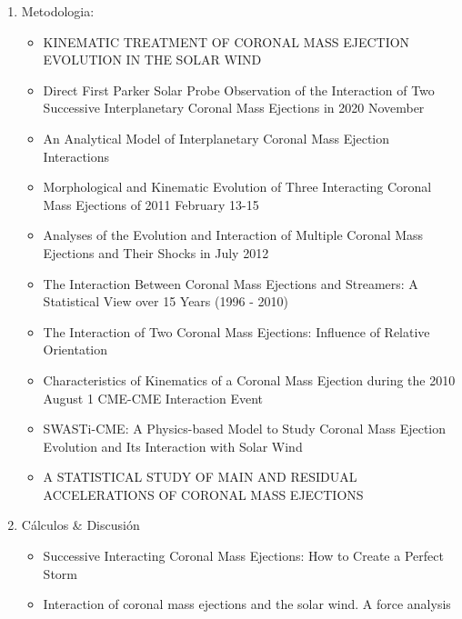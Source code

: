 \begin{enumerate}

    \item Metodologia:
    \begin{itemize}
    \item
    KINEMATIC TREATMENT OF CORONAL MASS EJECTION EVOLUTION IN THE SOLAR WIND
    \item
    Direct First Parker Solar Probe Observation of the Interaction of Two Successive Interplanetary Coronal Mass Ejections in 2020 November
    \item
    An Analytical Model of Interplanetary Coronal Mass Ejection Interactions
    \item
    Morphological and Kinematic Evolution of Three Interacting Coronal Mass Ejections of 2011 February 13-15
    \item
    Analyses of the Evolution and Interaction of Multiple Coronal Mass Ejections and Their Shocks in July 2012
    \item
    The Interaction Between Coronal Mass Ejections and Streamers: A Statistical View over 15 Years (1996 - 2010)
    \item
    The Interaction of Two Coronal Mass Ejections: Influence of Relative Orientation
    \item
    Characteristics of Kinematics of a Coronal Mass Ejection during the 2010 August 1 CME-CME Interaction Event
    \item
    SWASTi-CME: A Physics-based Model to Study Coronal Mass Ejection Evolution and
Its Interaction with Solar Wind
\item
A STATISTICAL STUDY OF MAIN AND RESIDUAL ACCELERATIONS
OF CORONAL MASS EJECTIONS
\end{itemize}

    \item Cálculos \& Discusión
    \begin{itemize}
        \item Successive Interacting Coronal Mass Ejections: How to Create a Perfect Storm
    \item Interaction of coronal mass ejections and the solar wind. A force analysis

    \end{itemize}
    


\end{enumerate}
